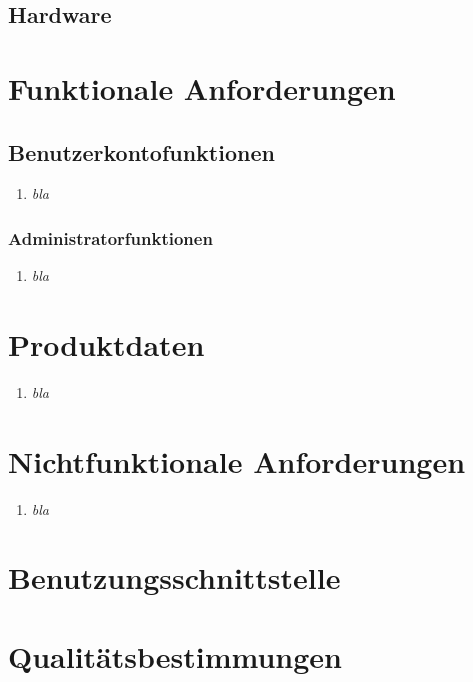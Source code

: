 \documentclass[parskip=full,11pt]{scrartcl}
\def\threedigits#1{%
  \ifnum#1<100 0\fi
  \ifnum#1<10 0\fi
  \number#1}
\begin{document}
\subsection{Hardware}


\section{Funktionale Anforderungen}
\subsection{Benutzerkontofunktionen}
\begin{enumerate}[label={\textbf{/F\protect\threedigits{\theenumi}}}, leftmargin=*]
\item \textit{bla}

\end{enumerate}

\subsubsection{Administratorfunktionen}
\begin{enumerate}[label={\textbf{/F\protect\threedigits{\theenumi}}}, leftmargin=*]
\item \textit{bla}
\end{enumerate}

\section{Produktdaten}
\begin{enumerate}[label={\textbf{/D\protect\threedigits{\theenumi}}}, leftmargin=*]
\item \textit{bla}
\end{enumerate}
\section{Nichtfunktionale Anforderungen}
\begin{enumerate}[label={\textbf{/NF\protect\threedigits{\theenumi}}}, leftmargin=*]
\item \textit{bla}
\end{enumerate}



\section{Benutzungsschnittstelle}

\section{Qualitätsbestimmungen}
\end{document}
